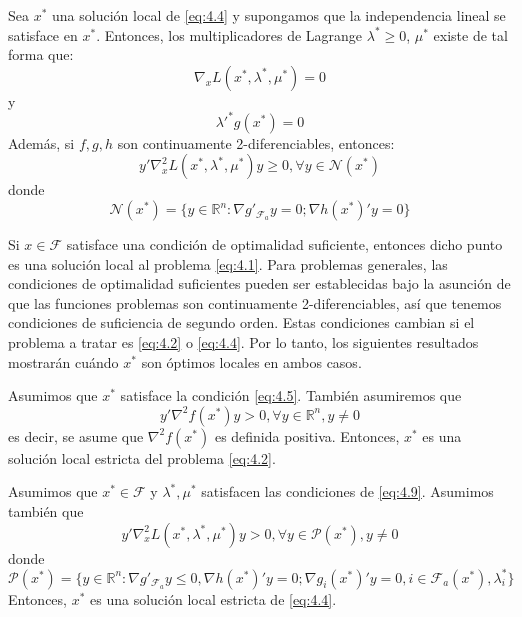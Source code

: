 \begin{proposicion}
Sea $x^*$ una solución local de \ref{eq:4.4} y supongamos que la independencia lineal se satisface en $x^*$. 
Entonces, los multiplicadores de Lagrange $\lambda^*\geq 0$, $\mu^*$ existe de tal forma que:
\begin{equation}
\nabla_xL(x^*,\lambda^*,\mu^*) = 0
\label{eq:4.9}
\end{equation}
y
\begin{equation*}
\lambda'^*g(x^*) = 0
\end{equation*}
Además, si $f,g,h$ son continuamente 2-diferenciables, entonces:
\begin{equation*}
y'\nabla_x^2L(x^*,\lambda^*,\mu^*)y \geq 0, \forall y\in\mathcal{N}(x^*)
\end{equation*}
donde
\begin{equation*}
\mathcal{N}(x^*) = \{y\in\mathbb{R}^n : \nabla g'_{\mathcal{F}_a}y=0; \nabla h(x^*)'y = 0\}
\end{equation*}
\end{proposicion}

Si $x\in\mathcal{F}$ satisface una condición de optimalidad suficiente, entonces dicho punto es una solución local al problema \ref{eq:4.1}. 
Para problemas generales, las condiciones de optimalidad suficientes pueden ser establecidas bajo la asunción de que las funciones problemas son continuamente 2-diferenciables, así que tenemos condiciones de suficiencia de segundo orden. 
Estas condiciones cambian si el problema a tratar es \ref{eq:4.2} o \ref{eq:4.4}. 
Por lo tanto, los siguientes resultados mostrarán cuándo $x^*$ son óptimos locales en ambos casos.

\begin{proposicion}
Asumimos que $x^*$ satisface la condición \ref{eq:4.5}. 
También asumiremos que 
\begin{equation*}
y'\nabla^2f(x^*)y > 0, \forall y\in\mathbb{R}^n, y \neq 0
\end{equation*}
es decir, se asume que $\nabla^2f(x^*)$ es definida positiva. 
Entonces, $x^*$ es una solución local estricta del problema \ref{eq:4.2}.
\end{proposicion}

\begin{proposicion}
Asumimos que $x^*\in\mathcal{F}$ y $\lambda^*,\mu^*$ satisfacen las condiciones de \ref{eq:4.9}. 
Asumimos también que 
\begin{equation}
y'\nabla^2_xL(x^*,\lambda^*,\mu^*)y > 0, \forall y\in\mathcal{P}(x^*), y\neq 0
\label{eq:4.10}
\end{equation}
donde
\begin{equation*}
\mathcal{P}(x^*) = \{y\in\mathbb{R}^n : \nabla g'_{\mathcal{F}_a} y\leq 0, \nabla h(x^*)'y = 0; \nabla g_i(x^*)'y = 0, i \in\mathcal{F}_a(x^*), \lambda_i^* \} 
\end{equation*}
Entonces, $x^*$ es una solución local estricta de \ref{eq:4.4}.
\end{proposicion}

